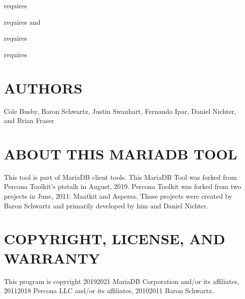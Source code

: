 \documentclass[letterpaper,10pt,english]{sphinxmanual}
\begin{document}
\sphinxAtStartPar
{\hyperref[\detokenize{mariadb-stat:cmdoption-mariadb-stat-collect-gdb}]{}} requires 

\sphinxAtStartPar
{\hyperref[\detokenize{mariadb-stat:cmdoption-mariadb-stat-collect-oprofile}]{}} requires  and 

\sphinxAtStartPar
{\hyperref[\detokenize{mariadb-stat:cmdoption-mariadb-stat-collect-strace}]{}} requires 

\sphinxAtStartPar
{\hyperref[\detokenize{mariadb-stat:cmdoption-mariadb-stat-collect-tcpdump}]{}} requires 


\section{AUTHORS}
\label{\detokenize{mariadb-stat:authors}}
\sphinxAtStartPar
Cole Busby, Baron Schwartz, Justin Swanhart, Fernando Ipar, Daniel Nichter,
and Brian Fraser


\section{ABOUT THIS MARIADB TOOL}
\label{\detokenize{mariadb-stat:about-this-mariadb-tool}}
\sphinxAtStartPar
This tool is part of MariaDB client tools. This MariaDB Tool was forked from
Percona Toolkit’s pt\sphinxhyphen{}stalk in August, 2019. Percona Toolkit was forked from two
projects in June, 2011: Maatkit and Aspersa.  Those projects were created by
Baron Schwartz and primarily developed by him and Daniel Nichter.


\section{COPYRIGHT, LICENSE, AND WARRANTY}
\label{\detokenize{mariadb-stat:copyright-license-and-warranty}}
\sphinxAtStartPar
This program is copyright 2019\sphinxhyphen{}2021 MariaDB Corporation and/or its affiliates,
2011\sphinxhyphen{}2018 Percona LLC and/or its affiliates, 2010\sphinxhyphen{}2011 Baron Schwartz.
\end{document}
